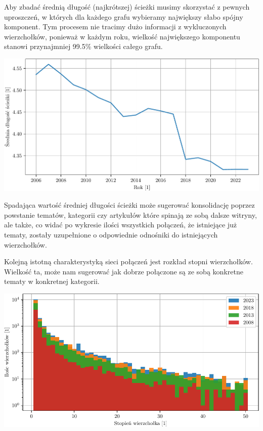 \documentclass[a4paper, 12pt]{article}
\begin{document}
Aby zbadać średnią długość (najkrótszej) ścieżki musimy skorzystać z pewnych uproszczeń, w których dla każdego grafu wybieramy największy słabo spójny komponent. Tym procesem nie tracimy dużo informacji z wykluczonych wierzchołków, ponieważ w każdym roku, wielkość największego komponentu stanowi przynajmniej 99.5\% wielkości całego grafu.

\begin{center}
    \includegraphics[width=0.90\linewidth]{figures/path.pdf}
\end{center}
Spadająca wartość średniej długości ścieżki może sugerować konsolidację poprzez powstanie tematów, kategorii czy artykułów które spinają ze sobą dalsze witryny, ale także, co widać po wykresie ilości wszystkich połączeń, że istniejące już tematy, zostały uzupełnione o odpowiednie odnośniki do istniejących wierzchołków.
\newpage

Kolejną istotną charakterystyką sieci połączeń jest rozkład stopni wierzchołków. Wielkość ta, może nam sugerować jak dobrze połączone są ze sobą konkretne tematy w konkretnej kategorii.
\begin{center}
    \includegraphics[width=0.90\linewidth]{figures/degreehist.pdf}
\end{center}
\begin{center}
    
\end{center}
\end{document}
